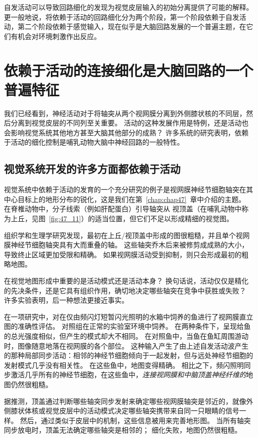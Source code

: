 自发活动可以导致回路细化的发现为视觉皮层输入的初始分离提供了可能的解释。
更一般地说，将依赖于活动的回路细化分为两个阶段，第一个阶段依赖于自发活动，第二个阶段依赖于感觉输入，现在似乎是大脑回路发展的一个普遍主题，在它们有机会对环境刺激作出反应。



\section{依赖于活动的连接细化是大脑回路的一个普遍特征}

我们已经看到，神经活动对于将轴突从两个视网膜分离到外侧膝状核的不同层，然后分离到视觉皮层的不同列至关重要。
活动的这种发展作用是特例，还是活动也会影响视觉系统其他地方甚至大脑其他部分的成熟？
许多系统的研究表明，依赖于活动的细化控制是哺乳动物大脑中神经回路的一般特性。



\subsection{视觉系统开发的许多方面都依赖于活动}

视觉系统中依赖于活动的发育的一个充分研究的例子是视网膜神经节细胞轴突在其中心目标上的地形分布的锐化，这是我们在第~\ref{chap:chap47}~章中介绍的主题。
在脊椎动物中，分子线索（例如肝配蛋白）引导轴突从 视顶盖（在哺乳动物中称为上丘，见图~\ref{fig:47_11}）的适当位置，但它们不足以形成精细的视觉图。


组织学和生理学研究发现，最初在上丘/视顶盖中形成的图很粗糙，并且单个视网膜神经节细胞轴突具有大而重叠的轴。
这些轴突乔木后来被修剪成成熟的大小，导致终止区域更加受限和精确。
如果视网膜活动受到抑制，则只会形成最初的粗略地图。


在视觉地图形成中重要的是活动模式还是活动本身？
换句话说，活动仅仅是精化的先决条件，还是它具有组织作用，确切地决定哪些轴突在竞争中获胜或失败？
许多实验表明，后一种想法更接近事实。


在一项研究中，对在仅由频闪灯短暂闪光照明的水箱中饲养的鱼进行了视网膜直立图的准确性评估。
对照组在正常的实验室环境中饲养。
在两种条件下，呈现给鱼的总光强度相似，但产生的模式却大不相同。
在对照鱼中，当鱼在鱼缸周围游动时，图像随意地落在视网膜的各个部位。
这种输入产生了由上述自发活动波产生的那种局部同步活动：相邻的神经节细胞倾向于一起发射，但与远处神经节细胞的发射模式几乎没有相关性。
在这些鱼中，地图变得精确。
相比之下，频闪照明同步激活几乎所有的神经节细胞，在这些鱼中，\textit{连接视网膜和中脑顶盖神经纤维的}地图仍然很粗糙。


据推测，顶盖通过判断哪些轴突同步发射来确定哪些视网膜轴突是邻近的，就像外侧膝状体核或视觉皮层中的活动模式决定哪些轴突携带来自同一只眼睛的信号一样。
然后，通过类似于皮层中的机制，这些信息被用来完善地形图。
当所有轴突同步放电时，顶盖无法确定哪些轴突是相邻的；
细化失败，地图仍然很粗糙。



